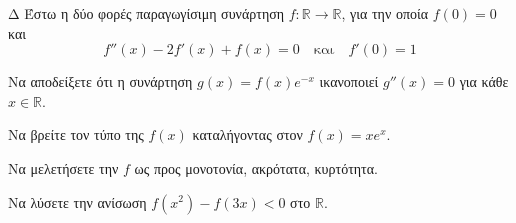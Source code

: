 \begin{thema}{Δ}
Έστω η δύο φορές παραγωγίσιμη συνάρτηση $f:\mathbb{R}\to\mathbb{R}$, για την οποία $f(0)=0$ και 
\[ f''(x) - 2f'(x) + f(x) = 0 \quad \text{και} \quad f'(0) = 1 \]
\begin{erwthma}
    \item Να αποδείξετε ότι η συνάρτηση $g(x) = f(x) e^{-x}$ ικανοποιεί $g''(x)=0$ για κάθε $x \in \mathbb{R}$.
    \item Να βρείτε τον τύπο της $f(x)$ καταλήγοντας στον $f(x) = x e^x$.
    \item Να μελετήσετε την $f$ ως προς μονοτονία, ακρότατα, κυρτότητα.
    \item Να λύσετε την ανίσωση $f(x^2) - f(3x) < 0$ στο $\mathbb{R}$.
\end{erwthma}
\end{thema}
